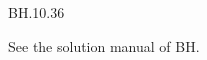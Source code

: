 
\setcounter{theorem}{35}
\begin{exercise} BH.10.36
\begin{solution}
See the solution manual of BH.
\end{solution}
\end{exercise}

